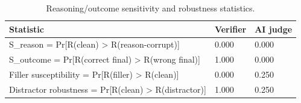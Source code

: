\begin{table}[t]
\centering
\small
\caption{Reasoning/outcome sensitivity and robustness statistics.}
\begin{tabular}{lll}
\toprule
Statistic & Verifier & AI judge \\
\midrule
S\_reason = Pr[R(clean) > R(reason-corrupt)] & 0.000 & 0.000 \\
S\_outcome = Pr[R(correct final) > R(wrong final)] & 1.000 & 0.000 \\
Filler susceptibility = Pr[R(filler) > R(clean)] & 0.000 & 0.250 \\
Distractor robustness = Pr[R(clean) > R(distractor)] & 1.000 & 0.250 \\
\bottomrule
\end{tabular}
\end{table}
